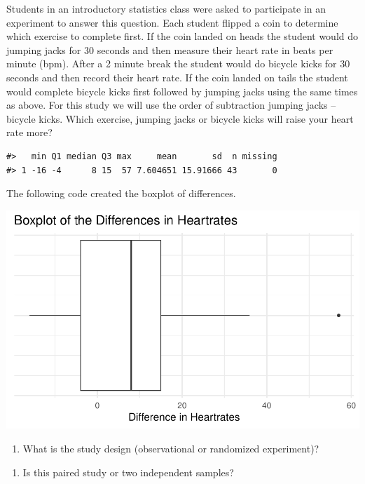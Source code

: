 \documentclass[
]{report}
\providecommand{\tightlist}{%
  \setlength{\itemsep}{0pt}\setlength{\parskip}{0pt}}
\begin{document}
Students in an introductory statistics class were asked to participate in an experiment to answer this question. Each student flipped a coin to determine which exercise to complete first. If the coin landed on heads the student would do jumping jacks for 30 seconds and then measure their heart rate in beats per minute (bpm). After a 2 minute break the student would do bicycle kicks for 30 seconds and then record their heart rate. If the coin landed on tails the student would complete bicycle kicks first followed by jumping jacks using the same times as above. For this study we will use the order of subtraction jumping jacks -- bicycle kicks. Which exercise, jumping jacks or bicycle kicks will raise your heart rate more?

\begin{verbatim}
#>   min Q1 median Q3 max     mean       sd  n missing
#> 1 -16 -4      8 15  57 7.604651 15.91666 43       0
\end{verbatim}

The following code created the boxplot of differences.

\begin{center}\includegraphics[width=0.6\linewidth]{14-UR-module11_review_files/figure-latex/unnamed-chunk-2-1} \end{center}

\begin{enumerate}
\def\labelenumi{\arabic{enumi}.}
\tightlist
\item
  What is the study design (observational or randomized experiment)?
\end{enumerate}

\vspace{0.5in}

\begin{enumerate}
\def\labelenumi{\arabic{enumi}.}
\setcounter{enumi}{1}
\tightlist
\item
  Is this paired study or two independent samples?
\end{enumerate}
\end{document}

